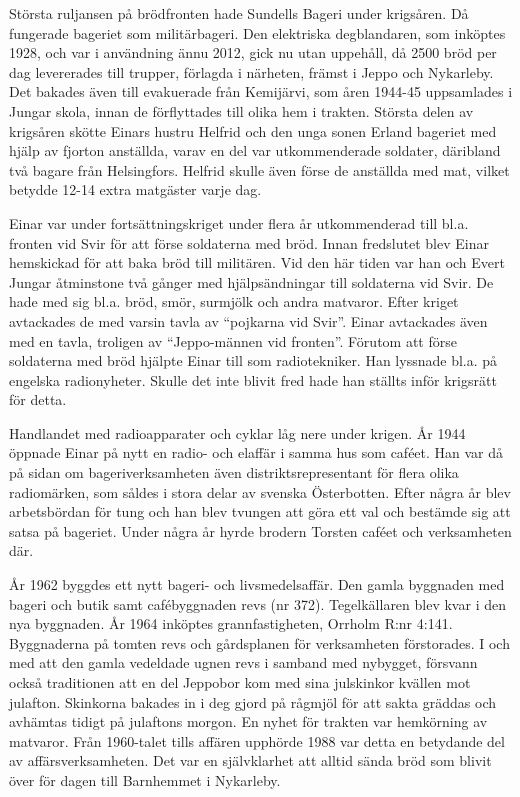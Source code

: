 Största ruljansen på brödfronten hade Sundells Bageri under krigsåren. Då fungerade bageriet som militärbageri. Den elektriska degblandaren, som inköptes 1928, och var i användning ännu 2012, gick nu utan uppehåll, då 2500 bröd per dag levererades till trupper, förlagda i närheten, främst i Jeppo och Nykarleby. Det bakades även till evakuerade från Kemijärvi, som åren 1944-45 uppsamlades i Jungar skola, innan de förflyttades till olika hem i trakten. Största delen av krigsåren skötte Einars hustru Helfrid och den unga sonen Erland bageriet med hjälp av fjorton anställda, varav en del var utkommenderade soldater, däribland två bagare från Helsingfors. Helfrid skulle även förse de anställda med mat, vilket betydde 12-14 extra matgäster varje dag.

Einar var under fortsättningskriget under flera år utkommenderad till bl.a. fronten vid Svir för att förse soldaterna med bröd. Innan fredslutet blev Einar hemskickad för att baka bröd till militären. Vid den här tiden var han och Evert Jungar åtminstone två gånger med hjälpsändningar till soldaterna vid Svir. De hade med sig bl.a. bröd, smör, surmjölk och andra matvaror. Efter kriget avtackades de med varsin tavla av ``pojkarna vid Svir''. Einar avtackades även med en tavla, troligen av ``Jeppo-männen vid fronten''. Förutom att förse soldaterna med bröd hjälpte Einar till som radiotekniker. Han lyssnade bl.a. på engelska radionyheter. Skulle det inte blivit fred hade han ställts inför krigsrätt för detta.

Handlandet med radioapparater och cyklar låg nere under krigen. År 1944 öppnade Einar på nytt en radio- och elaffär i samma hus som caféet. Han var då på sidan om bageriverksamheten även distriktsrepresentant för flera olika radiomärken, som såldes i stora delar av svenska Österbotten. Efter några år blev arbetsbördan för tung och han blev tvungen att göra ett val och bestämde sig att satsa på bageriet. Under några år hyrde brodern Torsten caféet och verksamheten där.

År 1962 byggdes ett nytt bageri- och livsmedelsaffär. Den gamla byggnaden med bageri och butik samt cafébyggnaden revs (nr 372). Tegelkällaren blev kvar i den nya byggnaden.  År 1964 inköptes grannfastigheten, Orrholm R:nr 4:141. Byggnaderna på tomten revs och gårdsplanen för verksamheten förstorades. I och med att den gamla vedeldade ugnen revs i samband med nybygget, försvann också traditionen att en del Jeppobor kom med sina julskinkor kvällen mot julafton. Skinkorna bakades in i deg gjord på rågmjöl för att sakta gräddas och avhämtas tidigt på julaftons morgon. En nyhet för trakten var hemkörning av matvaror. Från 1960-talet tills affären upphörde 1988 var detta en betydande del av affärsverksamheten. Det var en självklarhet att alltid sända bröd som blivit över för dagen till Barnhemmet i Nykarleby.

